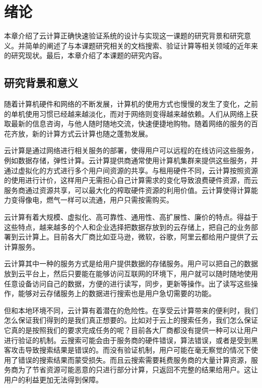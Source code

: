 \chapter{绪论}
\label{chap:introduction}

本章介绍了云计算正确快速验证系统的设计与实现这一课题的研究背景和研究意义。并简单的阐述了与本课题研究相关的文档搜索、验证计算等相关领域的近年来的研究现状。最后，本章介绍了本课题的研究内容。

\section{研究背景和意义}
随着计算机硬件和网络的不断发展，计算机的使用方式也慢慢的发生了变化，之前的单机使用习惯已经越来越淡化，而对于网络则变得越来越依赖。人们从网络上获取最新的信息咨询，与他人随时随地交流，快速便捷地购物。随着网络的服务的百花齐放，新的计算方式云计算也随之蓬勃发展。

云计算是通过网络进行相关服务的部署，使得用户可以远程的在线访问这些服务，例如数据存储，弹性计算。云计算提供商通常使用计算机集群来提供这些服务，并通过虚拟化的方式进行多个用户间资源的共享。与租用硬件不同，云计算按照资源的使用进行计价，这样用户无需担心自己计算需求的变化导致浪费硬件资源，而云服务商通过资源共享，可以最大化的榨取硬件资源的利用价值。云计算使得计算能力变得像电，燃气一样可以流通，用户只需按需购买。

云计算有着大规模、虚拟化、高可靠性、通用性、高扩展性、廉价的特点。得益于这些特点，越来越多的个人和企业选择把数据存放到的云存储上，把自己的业务部署到云计算上。目前各大厂商比如亚马逊，微软，谷歌，阿里云都给用户提供了云计算服务。

云计算其中一种的服务方式是给用户提供数据的存储服务。用户可以把自己的数据放到云平台上，然后只要能在能够访问互联网的环境下，用户就可以随时随地使用任意设备访问自己的数据，方便的进行读写，同步，更新等操作。出了读写这些操作，能够对云存储服务上的数据进行搜索也是用户急切需要的功能。

但和本地环境不同，云计算有着潜在的危险性。在享受云计算带来的便利时，我们怎么保证我们得到的是我们真正想要的。比如对于云上的搜索任务，我们怎么保证它真的是按照我们的要求完成任务的呢？目前各大厂商都没有提供一种可以让用户进行验证的机制。云搜索可能会由于服务商的硬件错误，算法错误，或者是受到黑客攻击导致搜索结果是错误的。而没有验证机制，用户可能在毫无察觉的情况下使用了错误的搜索结果而蒙受损失。而且云搜索需要耗费服务商的大量计算资源，服务商为了节省资源可能恶意的只进行部分计算，只返回不完整的结果给用户。这让用户的利益更加无法得到保障。

